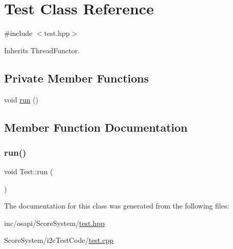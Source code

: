 \hypertarget{class_test}{}\section{Test Class Reference}
\label{class_test}


{\ttfamily \#include $<$test.\+hpp$>$}



Inherits Thread\+Functor.

\subsection*{Private Member Functions}
\begin{DoxyCompactItemize}
\item 
void \hyperlink{class_test_abb64a8b970de8b2422b9f56cd8719ca4}{run} ()
\end{DoxyCompactItemize}


\subsection{Member Function Documentation}
\mbox{\label{class_test_abb64a8b970de8b2422b9f56cd8719ca4}} 
\subsubsection{\texorpdfstring{run()}{run()}}
{\footnotesize\ttfamily void Test\+::run (\begin{DoxyParamCaption}{ }\end{DoxyParamCaption})\hspace{0.3cm}{\ttfamily [private]}}



The documentation for this class was generated from the following files\+:\begin{DoxyCompactItemize}
\item 
inc/osapi/\+Score\+System/\hyperlink{test_8hpp}{test.\+hpp}\item 
Score\+System/i2c\+Test\+Code/\hyperlink{test_8cpp}{test.\+cpp}\end{DoxyCompactItemize}
